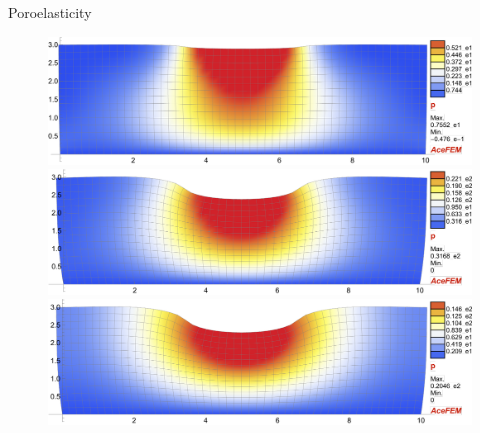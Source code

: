 \documentclass[aspectratio=169,xcolor=dvipsnames]{beamer}
\begin{document}
\begin{frame}{Poroelasticity}
	\begin{figure}
	\begin{minipage}{\linewidth}
		\begin{minipage}{0.3\linewidth}\centering
			\includegraphics[width=\linewidth]{punch_frame_1.pdf}
		\end{minipage}\hfill
		\begin{minipage}{0.3\linewidth}\centering
	\includegraphics[width=\linewidth]{punch_frame_2.pdf}
		\end{minipage}\hfill
		\begin{minipage}{0.3\linewidth}\centering
	\includegraphics[width=\linewidth]{punch_frame_3.pdf}
		\end{minipage}
	\end{minipage}
\end{figure}


\end{frame}
\end{document}
